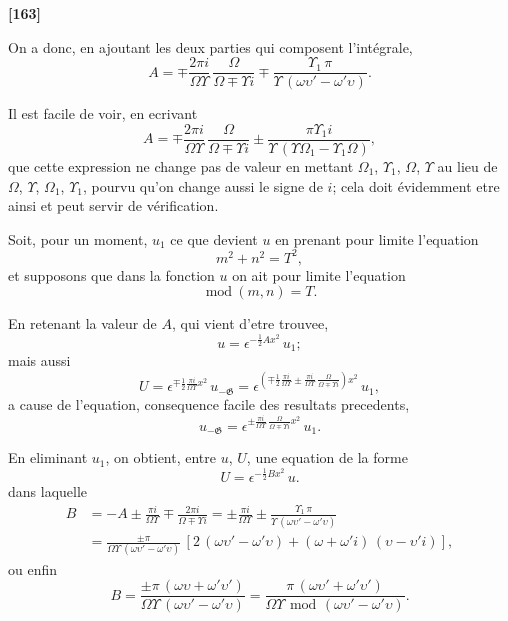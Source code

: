 \documentclass[11pt,a4paper]{book}
\providecommand{\modd}{\ \mathrm{mod}\ }
\begin{document}
\textbf{[163]}

On a donc, en ajoutant les deux parties qui composent l'int\'egrale,
\begin{equation}
A = \mp \frac{2\pi i}{\Omega\Upsilon}\, \frac{\Omega}{\Omega \mp \Upsilon i} \mp \frac{\Upsilon_1\, \pi}{\Upsilon\, (\omega\upsilon' - \omega'\upsilon)}. \tag{14}
\end{equation}

Il est facile de voir, en ecrivant
\[A = \mp \frac{2\pi i}{\Omega\Upsilon}\, \frac{\Omega}{\Omega \mp \Upsilon i} \pm \frac{\pi\Upsilon_1 i}{\Upsilon\, (\Upsilon\Omega_1 - \Upsilon_1\Omega)},\]
que cette expression ne change pas de valeur en mettant $\Omega_1$, $\Upsilon_1$, $\Omega$, $\Upsilon$ au lieu de
$\Omega$, $\Upsilon$, $\Omega_1$, $\Upsilon_1$, pourvu qu'on change aussi le signe de $i$; cela doit \'evidemment etre ainsi
et peut servir de v\'erification.

Soit, pour un moment, $u_1$ ce que devient $u$ en prenant pour limite l'equation
\[m^2 + n^2 = T^2,\]
et supposons que dans la fonction $u$ on ait pour limite l'equation
\[\modd(m, n) = T.\]

En retenant la valeur de $A$, qui vient d'etre trouvee,
\[u = \epsilon^{-\frac{1}{2}Ax^2}\, u_1;\]
mais aussi
\[U = \epsilon^{\mp \frac{1}{2}\frac{\pi i}{\Omega\Upsilon} x^2}\, u_{-\mathfrak{G}}
= \epsilon^{\left(\mp \frac{1}{2}\frac{\pi i}{\Omega\Upsilon} \pm \frac{\pi i}{\Omega\Upsilon}\, \frac{\Omega}{\Omega \mp \Upsilon i}\right) x^2}\, u_1,\]
a cause de l'equation, consequence facile des resultats precedents,
\[u_{-\mathfrak{G}} = \epsilon^{\pm \frac{\pi i}{\Omega\Upsilon}\, \frac{\Omega}{\Omega \mp \Upsilon i} x^2}\, u_1.\]

En eliminant $u_1$, on obtient, entre $u$, $U$, une equation de la forme
\begin{equation}
U = \epsilon^{-\frac{1}{2}Bx^2}\, u. \tag{15}
\end{equation}
dans laquelle
\begin{align*}
B &= -A \pm \frac{\pi i}{\Omega\Upsilon} \mp \frac{2\pi i}{\Omega \mp \Upsilon i}
= \pm \frac{\pi i}{\Omega\Upsilon} \pm \frac{\Upsilon_1\, \pi}{\Upsilon\, (\omega\upsilon' - \omega'\upsilon)}\\
&= \frac{\pm\pi}{\Omega\Upsilon\, (\omega\upsilon' - \omega'\upsilon)}\, [2\, (\omega\upsilon' - \omega'\upsilon) + (\omega + \omega'i)\, (\upsilon - \upsilon'i)],
\end{align*}
ou enfin
\begin{equation}
B = \frac{\pm\pi\, (\omega\upsilon + \omega'\upsilon')}{\Omega\Upsilon\, (\omega\upsilon' - \omega'\upsilon)}
= \frac{\pi\, (\omega\upsilon' + \omega'\upsilon')}{\Omega\Upsilon\, \modd\, (\omega\upsilon' - \omega'\upsilon)}. \tag{16}
\end{equation}
\end{document}
